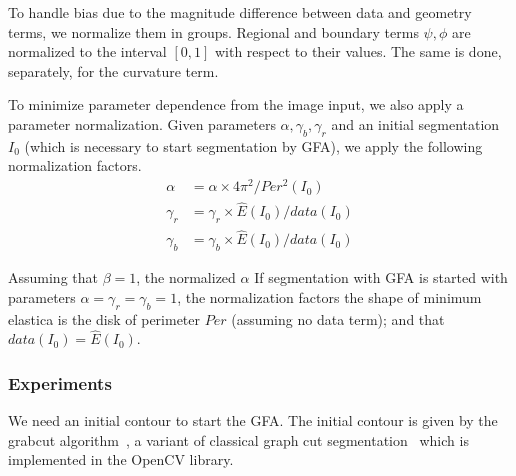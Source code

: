 \documentclass[review]{siamart220329}
\begin{document}
%
%
To handle bias due to the magnitude difference between data and geometry terms, we normalize them in groups. Regional and boundary terms $\psi,\phi$ are normalized to the interval $[0,1]$ with respect to their values. The same is done, separately, for the curvature term.

To minimize parameter dependence from the image input, we also apply a parameter normalization. Given parameters $\alpha, \gamma_b, \gamma_r$ and an initial segmentation $I_0$ (which is necessary to start segmentation by GFA), we apply the following normalization factors.
%
%
\begin{align*}
    \alpha & = \alpha \times 4\pi^2/Per^2(I_0) \\
	\gamma_r & = \gamma_r \times \hat{E}(I_0)/data(I_0) \\	
	\gamma_b & = \gamma_b \times \hat{E}(I_0)/data(I_0)		
\end{align*}

{
Assuming that $\beta=1$, the normalized $\alpha$   
If segmentation with GFA is started with parameters $\alpha=\gamma_r=\gamma_b=1$, 
the normalization factors the shape of minimum elastica is the disk of perimeter $Per$ (assuming no data term); and that $data(I_0)=\hat{E}(I_0)$.}
%
%
\subsubsection{Experiments}
We need an initial contour to start the GFA. The initial contour is given by the grabcut algorithm~\cite{rother04grabcut}, a variant of classical graph cut segmentation~\cite{boykov01graphcut} which is implemented in the OpenCV library.
\end{document}
